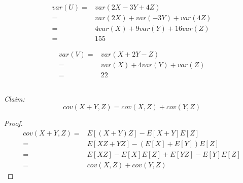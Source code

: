 \documentclass{article}
\begin{document}
            \begin{equation*}
                \begin{split}
                    var(U)=&var(2X-3Y+4Z)\\
                        =&var(2X)+var(-3Y)+var(4Z)\\
                        =&4var(X)+9var(Y)+16var(Z)\\
                        =&155
                \end{split}
            \end{equation*}

            \begin{equation*}
                \begin{split}
                    var(V)=&var(X+2Y-Z)\\
                        =&var(X)+4var(Y)+var(Z)\\
                        =&22
                \end{split}
            \end{equation*}


        \subsection{}
        \textit{Claim:}
            $$cov(X+Y,Z)=cov(X,Z)+cov(Y,Z)$$
           
        \begin{proof}
            \begin{equation*}
                \begin{split}
                    cov(X+Y,Z)=&E[(X+Y)Z]-E[X+Y]E[Z]\\
                        =&E[XZ+YZ]-(E[X]+E[Y])E[Z]\\
                        =&E[XZ]-E[X]E[Z]+E[YZ]-E[Y]E[Z]\\
                        =&cov(X,Z)+cov(Y,Z)
                \end{split}
            \end{equation*}
        \end{proof}
\end{document}

